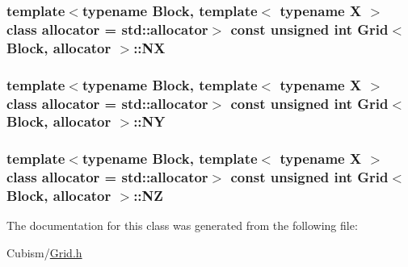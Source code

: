\subsubsection[{N\+X}]{\setlength{\rightskip}{0pt plus 5cm}template$<$typename Block, template$<$ typename X $>$ class allocator = std\+::allocator$>$ const unsigned int {\bf Grid}$<$ Block, allocator $>$\+::N\+X\hspace{0.3cm}{\ttfamily [protected]}}\label{class_grid_a5253120e941ec878f57dd17d5f54cadd}
\hypertarget{class_grid_a8956891d20426acabca4252ec7e299bc}{}
\subsubsection[{N\+Y}]{\setlength{\rightskip}{0pt plus 5cm}template$<$typename Block, template$<$ typename X $>$ class allocator = std\+::allocator$>$ const unsigned int {\bf Grid}$<$ Block, allocator $>$\+::N\+Y\hspace{0.3cm}{\ttfamily [protected]}}\label{class_grid_a8956891d20426acabca4252ec7e299bc}
\hypertarget{class_grid_ad6632ff47c714e008ba88a89b4c1684b}{}
\subsubsection[{N\+Z}]{\setlength{\rightskip}{0pt plus 5cm}template$<$typename Block, template$<$ typename X $>$ class allocator = std\+::allocator$>$ const unsigned int {\bf Grid}$<$ Block, allocator $>$\+::N\+Z\hspace{0.3cm}{\ttfamily [protected]}}\label{class_grid_ad6632ff47c714e008ba88a89b4c1684b}


The documentation for this class was generated from the following file\+:\begin{DoxyCompactItemize}
\item 
Cubism/\hyperlink{_grid_8h}{Grid.\+h}\end{DoxyCompactItemize}
